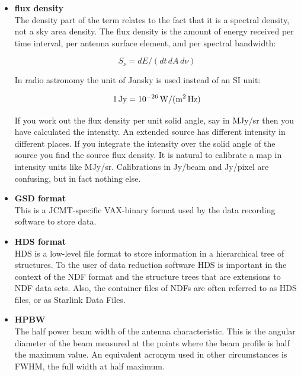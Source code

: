 \documentclass[11pt]{article}
\newcommand{\xref}[3]{#1}
\begin{document}
\begin{itemize}
\item{\bf \label{glossflux}flux density}\\
   The density part of the
   term relates to the fact that it is a spectral density, not a sky
   area density. The flux density is the amount of energy received per
   time interval, per antenna surface element, and per spectral
   bandwidth:

\[S_{\nu} = dE / (dt\, dA\, d\nu)\]

   In radio astronomy the unit of Jansky is used instead of an SI unit:

\[1\,{\rm Jy} = 10^{-26}\,{\rm W / (m^2\, Hz)}\]

   If you work out the flux density per unit solid angle, say in
   MJy/sr then you have calculated the intensity. An extended
   source has different intensity in different places. If you integrate
   the intensity over the solid angle of the source you find the source
   flux density. It is natural to calibrate a map in intensity units
   like MJy/sr. Calibrations in Jy/beam and Jy/pixel are confusing, but
   in fact nothing else.

\item{\bf \label{glossgsd}GSD format}\\
   This is a JCMT-specific VAX-binary
   format used by the data recording software to store data.

\item{\bf \label{glosshds}HDS format}\\
\xref{HDS}{sun92}{}
   is a low-level file format to
   store information in a hierarchical tree of structures. To the user
   of data reduction software HDS is important in the context of the NDF
   format and the structure trees that are extensions to NDF data sets.
   Also, the container files of NDFs are often referred to as HDS files,
   or as Starlink Data Files.

\item{\bf \label{glosshpbw}HPBW}\\
   The half power beam width of the antenna
   characteristic. This is the angular diameter of the beam measured at
   the points where the beam profile is half the maximum value. An
   equivalent acronym used in other circumstances is FWHM, the full
   width at half maximum.


\end{itemize}
\end{document}
